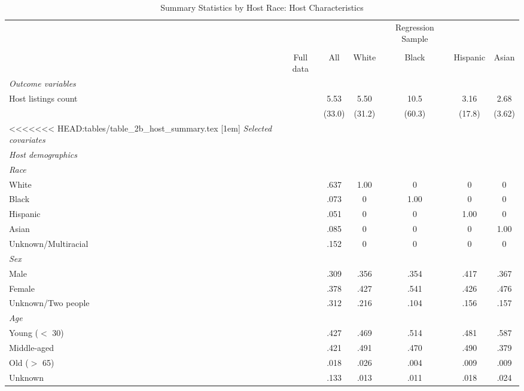 {
	\begin{longtable}{l*{6}{c}}
		\caption{Summary Statistics by Host Race: Host Characteristics}\\
		
		\hline
		&\multicolumn{1}{c}{}&\multicolumn{1}{c}{}&\multicolumn{1}{c}{}&\multicolumn{1}{c}{Regression Sample}&\multicolumn{1}{c}{}&\multicolumn{1}{c}{}\\
		\cline{3-7}\\
			&\multicolumn{1}{c}{Full data}&\multicolumn{1}{c}{All}&\multicolumn{1}{c}{White}&\multicolumn{1}{c}{Black}&\multicolumn{1}{c}{Hispanic}&\multicolumn{1}{c}{Asian}\\
		\hline\hline           
		     
		\textit{Outcome variables} \\
		Host listings count         & &      5.53&      5.50 &      10.5&    3.16 & 2.68\\
		&	&     (33.0)         &     (31.2)         &     (60.3)         &     (17.8) & 	(3.62)         \\
<<<<<<< HEAD:tables/table_2b_host_summary.tex
		[1em]
		\textit{Selected covariates} \\
		\hline\hline
		\textit{Host demographics} \\
		\hline
		\textit{Race} \\
		White     & &      .637         &       1.00         &      0         &      0 	& 		0         \\
		Black     &  &    .073       &       0         &      1.00         &      0 	& 		0         \\
		Hispanic     & &      .051         &       0         &      0         &      1.00 	& 		0         \\
		Asian     &   &   .085      &       0         &      0         &      0 	& 		1.00         \\
		Unknown/Multiracial     & &      .152         &       0         &      0         &      0 	& 		0         \\
		[1em]
		\textit{Sex} \\
		Male     & &      .309         &       .356         &      .354         &      .417 	& 		.367        \\
		Female     & &      .378         &       .427        &      .541         &      .426 	& 		.476         \\
		Unknown/Two people   &  &      .312         &       .216         &      .104         &      .156 	& 		.157         \\
		[1em]
		\textit{Age} \\
		Young ($<$ 30)     & &      .427         &       .469         &      .514        &      .481 	& 		.587         \\
		Middle-aged     & &      .421         &       .491        &      .470         &      .490 		& 		.379         \\
		Old ($>$ 65)     & &      .018         &       .026         &      .004         &      .009	& 		.009         \\
		Unknown    &  &      .133         &       .013         &      .011         &      .018 	& 		.024         \\
		[1em]
	

\end{longtable}}

